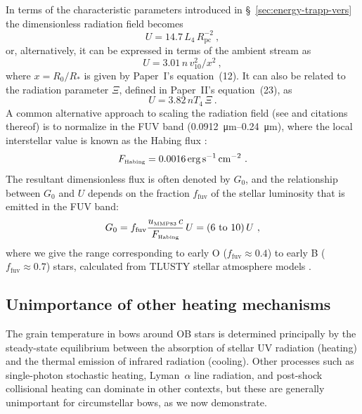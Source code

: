 In terms of the characteristic parameters introduced in
\S~\ref{sec:energy-trapp-vers} the dimensionless radiation field
becomes
\begin{equation}
  \label{eq:U-from-L4-and-Rpc}
  U = 14.7\, L_4\, R_{\text{pc}}^{-2} \ ,
\end{equation}
or, alternatively, it can be expressed in terms of the ambient stream as
\begin{equation}
  \label{eq:U-from-ambient}
  U = 3.01 \, n \, v_{10}^2 / x^2 \ , 
\end{equation}
where \(x = R_0/R_*\) is given by Paper~I's equation~(12).
It can also be related to the radiation parameter \(\Xi\), defined in
Paper~II's equation~(23), as
\begin{equation}
  \label{eq:U-vs-Xi}
  U = 3.82 \, n T_4 \, \Xi \ .
\end{equation}
A common alternative approach to scaling the radiation field (see
\citealp{Tielens:1985a} and citations thereof) is to normalize in the
FUV band (\SIrange{0.0912}{0.24}{\um}), where the local interstellar
value is known as the Habing flux \citep{Habing:1968a}:
\begin{equation}
  \label{eq:Habing-flux}
  F_{\text{\tiny Habing}} = \SI{0.0016}{erg.s^{-1}.cm^{-2}} \ .
\end{equation}
The resultant dimensionless flux is often denoted by \(G_0\), and the
relationship between \(G_0\) and \(U\) depends on the fraction
\(f_{\text{fuv}}\) of the stellar luminosity that is emitted in the
FUV band:
\begin{equation}
  \label{eq:G-vs-U}
  G_0 = f_{\text{fuv}} \frac{u\mmp\, c}{F\Hab} \,U = (\text{\numrange{6}{10}}) \,U \ ,
\end{equation}
where we give the range corresponding to early O
(\(f_{\text{fuv}} \approx 0.4\)) to early B
(\(f_{\text{fuv}} \approx 0.7\)) stars, calculated from TLUSTY stellar
atmosphere models \citep{Lanz:2003a, Lanz:2007a}.


\subsection{Unimportance of other heating mechanisms}
\label{sec:unimp-other-heat}
The grain temperature in bows around OB stars is determined
principally by the steady-state equilibrium between the absorption of
stellar UV radiation (heating) and the thermal emission of infrared
radiation (cooling).  Other processes such as single-photon stochastic
heating, Lyman~\(\alpha\) line radiation, and post-shock collisional
heating can dominate in other contexts, but these are generally
unimportant for circumstellar bows, as we now demonstrate.

